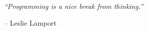 
\pagestyle{empty}
\ifdim\pagetotal>0pt\relax\newpage\fi
\vspace*{\fill}

{\Large\textit{``Programming is a nice break from thinking.''}}

\begin{flushright}
-- Leslie Lamport
\end{flushright}

\vspace*{\fill}
